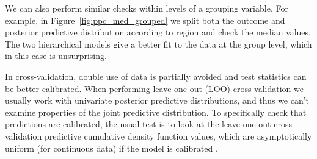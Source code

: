 \documentclass{statsoc}
\begin{document}
We can also perform similar checks within levels of a grouping variable. For
example, in Figure~\ref{fig:ppc_med_grouped} we split both the outcome and
posterior predictive distribution according to region and check the median
values. The two hierarchical models give a better fit to the data at
the group level, which in this case is unsurprising.

In cross-validation, double use of data is partially avoided and test
statistics can be better calibrated.  When performing leave-one-out (LOO)
cross-validation we usually work with univariate posterior predictive
distributions, and thus we can't examine properties of the joint predictive
distribution. To specifically check that predictions are calibrated, the usual
test is to look at the leave-one-out cross-validation predictive cumulative
density function values, which are asymptotically uniform (for continuous data)
if the model is calibrated \citep{GelfandDeyChang1992, gelman2013bda}.
\end{document}
